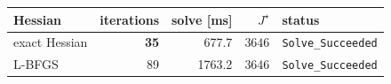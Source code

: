\begin{tabular}{lrrrl}
  \toprule
  Hessian & iterations & solve [ms] & $J^\star$ & status \\
  \midrule
  exact Hessian & \textbf{35} & 677.7 & $3646$ & \texttt{Solve\_Succeeded} \\
  L-BFGS & 89 & 1763.2 & $3646$ & \texttt{Solve\_Succeeded} \\
  \bottomrule
\end{tabular}
